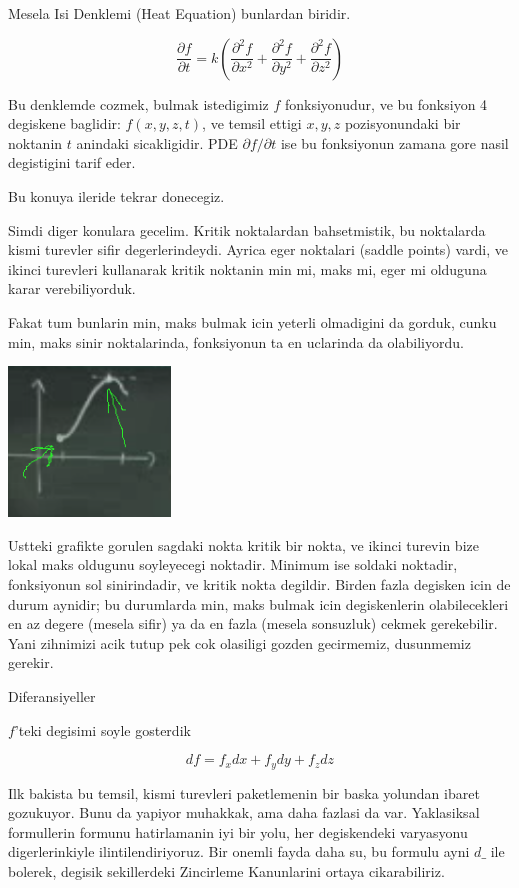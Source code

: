 \documentclass[12pt,fleqn]{article}\usepackage{../common}
\begin{document}
Mesela Isi Denklemi (Heat Equation) bunlardan biridir. 

\[ \frac{\partial f}{\partial t}  = k (
\frac{\partial^2 f}{\partial x^2} + 
\frac{\partial^2 f}{\partial y^2} + 
\frac{\partial^2 f}{\partial z^2} )
\]

Bu denklemde cozmek, bulmak istedigimiz $f$ fonksiyonudur, ve bu
fonksiyon 4 degiskene baglidir: $f(x,y,z,t)$, ve temsil ettigi $x,y,z$
pozisyonundaki bir noktanin $t$ anindaki sicakligidir. PDE
$\partial f/\partial t$ ise bu fonksiyonun zamana gore nasil degistigini
tarif eder. 

Bu konuya ileride tekrar donecegiz. 

Simdi diger konulara gecelim. Kritik noktalardan bahsetmistik, bu
noktalarda kismi turevler sifir degerlerindeydi. Ayrica eger noktalari
(saddle points) vardi, ve ikinci turevleri kullanarak kritik noktanin min
mi, maks mi, eger mi  olduguna karar verebiliyorduk. 

Fakat tum bunlarin min, maks bulmak icin yeterli olmadigini da gorduk,
cunku min, maks sinir noktalarinda, fonksiyonun ta en uclarinda da
olabiliyordu. 

\includegraphics[height=4cm]{15_1.png}

Ustteki grafikte gorulen sagdaki nokta kritik bir nokta, ve ikinci turevin
bize lokal maks oldugunu soyleyecegi noktadir. Minimum ise soldaki
noktadir, fonksiyonun sol sinirindadir, ve kritik nokta degildir. Birden
fazla degisken icin de durum aynidir; bu durumlarda min, maks bulmak icin
degiskenlerin olabilecekleri en az degere (mesela sifir) ya da en fazla
(mesela sonsuzluk) cekmek gerekebilir. Yani zihnimizi acik tutup pek cok
olasiligi gozden gecirmemiz, dusunmemiz gerekir. 

Diferansiyeller 

$f$'teki degisimi soyle gosterdik

\[ df = f_xdx + f_ydy + f_zdz  \]

Ilk bakista bu temsil, kismi turevleri paketlemenin bir baska yolundan
ibaret gozukuyor. Bunu da yapiyor muhakkak, ama daha fazlasi da
var. Yaklasiksal formullerin formunu hatirlamanin iyi bir yolu, her
degiskendeki varyasyonu digerlerinkiyle ilintilendiriyoruz. Bir onemli
fayda daha su, bu formulu ayni $d\_$ ile bolerek, degisik sekillerdeki
Zincirleme Kanunlarini ortaya cikarabiliriz. 
\end{document}
